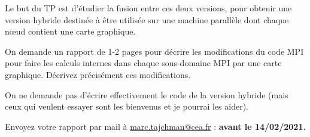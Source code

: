 \documentclass{beamer}
\begin{document}
\begin{frame}
\medskip
 
Le but du TP est d'étudier la fusion entre ces deux versions, pour obtenir une version hybride destinée à être utilisée sur une machine parallèle dont chaque n\oe ud contient une carte graphique.
  
   \vfill

On demande un rapport de 1-2 pages pour décrire les modifications du code MPI pour faire les calculs internes dans chaque sous-domaine MPI par une carte graphique.
Décrivez précisément ces modifications. 

   \vfill


On ne demande pas d'écrire effectivement le code de la version hybride (mais ceux qui veulent essayer sont les bienvenus et je pourrai les aider).
   
   \vfill
Envoyez votre rapport par mail à \href{mailto:marc.tajchman@cea.fr}{marc.tajchman@cea.fr} :
{\bf avant le 14/02/2021.}

\end{frame}
\end{document}
